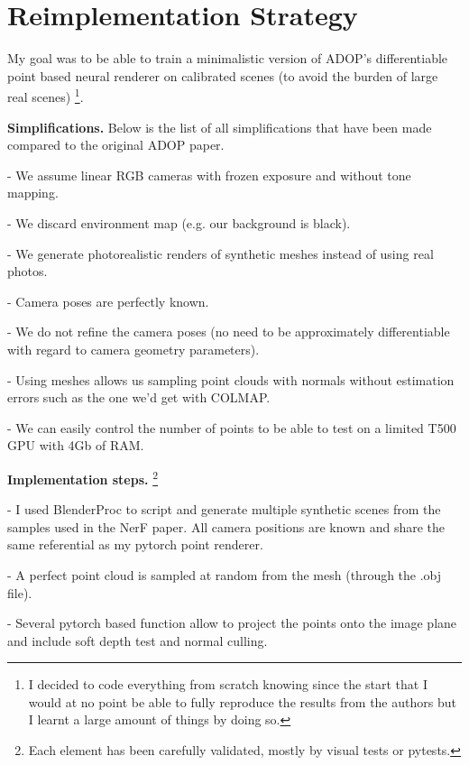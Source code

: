 \section{Reimplementation Strategy}
\label{sec:remplementation}

My goal was to be able to train a minimalistic version of ADOP's differentiable point based neural renderer on calibrated scenes (to avoid the burden of large real scenes) \footnote{I decided to code everything from scratch knowing since the start that I would at no point be able to fully reproduce the results from the authors but I learnt a large amount of things by doing so.}. 

\noindent \textbf{Simplifications.} Below is the list of all simplifications that have been made compared to the original ADOP paper.

\noindent -  We assume linear RGB cameras with frozen exposure and without tone mapping.

\noindent -  We discard environment map (e.g. our background is black).

\noindent -  We generate photorealistic renders of synthetic meshes instead of using real photos. 

\noindent -  Camera poses are perfectly known.

\noindent -  We do not refine the camera poses (no need to be approximately differentiable with regard to camera geometry parameters).

\noindent -  Using meshes allows us sampling point clouds with normals without estimation errors such as the one we'd get with COLMAP.

\noindent -  We can easily control the number of points to be able to test on a limited T500 GPU with 4Gb of RAM.

\noindent \textbf{Implementation steps.} \footnote{Each element has been carefully validated, mostly by visual tests or pytests.}

\noindent -  I used BlenderProc \cite{Denninger2023} to script and generate multiple synthetic scenes from the samples used in the NerF paper. All camera positions are known and share the same referential as my pytorch point renderer.

\noindent -  A perfect point cloud is sampled at random from the mesh (through the .obj file).

\noindent -  Several pytorch based function allow to project the points onto the image plane and include soft depth test and normal culling.

